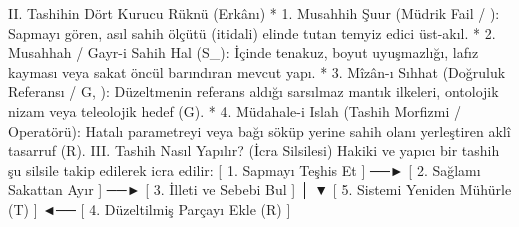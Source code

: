\documentclass[11pt,a4paper]{article}
\begin{document}
II. Tashihin Dört Kurucu Rüknü (Erkânı)
 * 1. Musahhih Şuur (Müdrik Fail / ): Sapmayı gören, asıl sahih ölçütü (itidali) elinde tutan temyiz edici üst-akıl.
 * 2. Musahhah / Gayr-i Sahih Hal (S_{}): İçinde tenakuz, boyut uyuşmazlığı, lafız kayması veya sakat öncül barındıran mevcut yapı.
 * 3. Mîzân-ı Sıhhat (Doğruluk Referansı / G, ): Düzeltmenin referans aldığı sarsılmaz mantık ilkeleri, ontolojik nizam veya teleolojik hedef (G).
 * 4. Müdahale-i Islah (Tashih Morfizmi / Operatörü): Hatalı parametreyi veya bağı söküp yerine sahih olanı yerleştiren aklî tasarruf (R).
III. Tashih Nasıl Yapılır? (İcra Silsilesi)
Hakiki ve yapıcı bir tashih şu silsile takip edilerek icra edilir:
[ 1. Sapmayı Teşhis Et ] ──► [ 2. Sağlamı Sakattan Ayır ] ──► [ 3. İlleti ve Sebebi Bul ]
                                                                       │
                                                                       ▼
[ 5. Sistemi Yeniden Mühürle (T) ] ◄── [ 4. Düzeltilmiş Parçayı Ekle (R) ]
\end{document}
